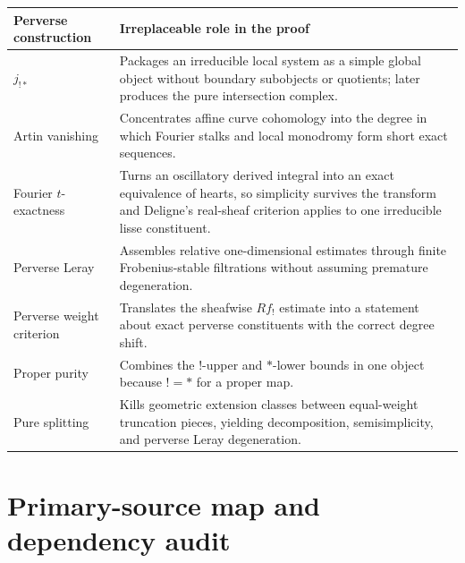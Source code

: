 \begin{center}
\begin{tabularx}{\textwidth}{>{\raggedright\arraybackslash}p{}
                              >{\raggedright\arraybackslash}X}
\toprule
Perverse construction & Irreplaceable role in the proof\\
\midrule
\(j_{!*}\) &
Packages an irreducible local system as a simple global object without
boundary subobjects or quotients; later produces the pure intersection
complex.\\
\addlinespace
Artin vanishing &
Concentrates affine curve cohomology into the degree in which Fourier
stalks and local monodromy form short exact sequences.\\
\addlinespace
Fourier \(t\)-exactness &
Turns an oscillatory derived integral into an exact equivalence of hearts,
so simplicity survives the transform and Deligne's real-sheaf criterion
applies to one irreducible lisse constituent.\\
\addlinespace
Perverse Leray &
Assembles relative one-dimensional estimates through finite
Frobenius-stable filtrations without assuming premature degeneration.\\
\addlinespace
Perverse weight criterion &
Translates the sheafwise \(Rf_!\) estimate into a statement about exact
perverse constituents with the correct degree shift.\\
\addlinespace
Proper purity &
Combines the \(!\)-upper and \(*\)-lower bounds in one object because
\(!=*\) for a proper map.\\
\addlinespace
Pure splitting &
Kills geometric extension classes between equal-weight truncation pieces,
yielding decomposition, semisimplicity, and perverse Leray degeneration.\\
\bottomrule
\end{tabularx}
\end{center}

\section{Primary-source map and dependency audit}

